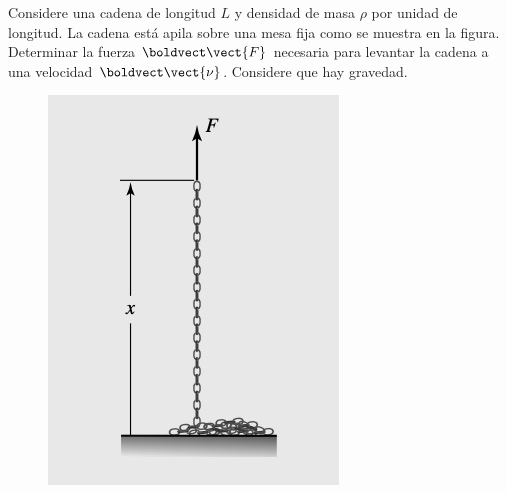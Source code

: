 \documentclass[../main.tex]{subfiles}
\begin{document}
\begin{problema}
	Considere una cadena de longitud \(L\) y densidad de masa \(\rho\) por
	unidad de longitud. La cadena está apila sobre una mesa fija como
	se muestra en la figura. Determinar la fuerza \(\boldvect\vect{F}\)
	necesaria para levantar la cadena a una velocidad \(\boldvect\vect{\nu}\). Considere
	que hay gravedad.

	\begin{figure}[htb]
		\centering
		\includegraphics[width=.3\textwidth]{figs/problema01-000.jpg}
	\end{figure}
\end{problema}
\end{document}
